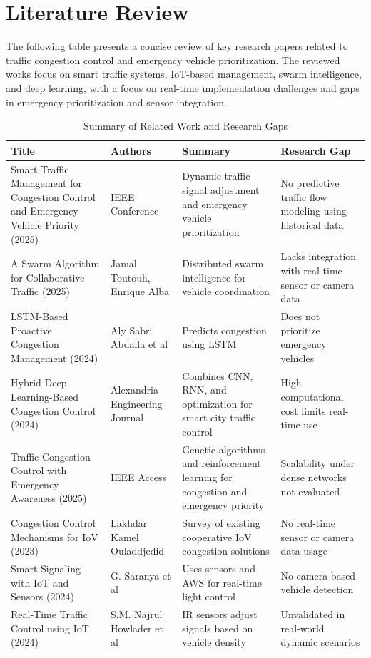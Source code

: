 \section[Literature Review]{\textbf{Literature Review}}

The following table presents a concise review of key research papers related to traffic congestion control and emergency vehicle prioritization. The reviewed works focus on smart traffic systems, IoT-based management, swarm intelligence, and deep learning, with a focus on real-time implementation challenges and gaps in emergency prioritization and sensor integration.



\begin{table}[h!]
\begin{adjustbox}{width=\linewidth,left}
\begin{tabular}{|p{4cm}|p{3.5cm}|p{5.5cm}|p{4.5cm}|}
\hline
\textbf{Title} & \textbf{Authors} & \textbf{Summary} & \textbf{Research Gap} \\
\hline
Smart Traffic Management for Congestion Control and Emergency Vehicle Priority (2025) & IEEE Conference & Dynamic traffic signal adjustment and emergency vehicle prioritization & No predictive traffic flow modeling using historical data \\
\hline
A Swarm Algorithm for Collaborative Traffic (2025) & Jamal Toutouh, Enrique Alba & Distributed swarm intelligence for vehicle coordination & Lacks integration with real-time sensor or camera data \\
\hline
LSTM-Based Proactive Congestion Management (2024) & Aly Sabri Abdalla et al & Predicts congestion using LSTM & Does not prioritize emergency vehicles \\
\hline
Hybrid Deep Learning-Based Congestion Control (2024) & Alexandria Engineering Journal & Combines CNN, RNN, and optimization for smart city traffic control & High computational cost limits real-time use \\
\hline
Traffic Congestion Control with Emergency Awareness (2025) & IEEE Access & Genetic algorithms and reinforcement learning for congestion and emergency priority & Scalability under dense networks not evaluated \\
\hline
Congestion Control Mechanisms for IoV (2023) & Lakhdar Kamel Ouladdjedid & Survey of existing cooperative IoV congestion solutions & No real-time sensor or camera data usage \\
\hline
Smart Signaling with IoT and Sensors (2024) & G. Saranya et al & Uses sensors and AWS for real-time light control & No camera-based vehicle detection \\
\hline
Real-Time Traffic Control using IoT (2024) & S.M. Najrul Howlader et al & IR sensors adjust signals based on vehicle density & Unvalidated in real-world dynamic scenarios \\
\hline
\end{tabular}
\end{adjustbox}
\vspace{0.5em} %
\caption{Summary of Related Work and Research Gaps}
\label{tab:literature}
\end{table}


